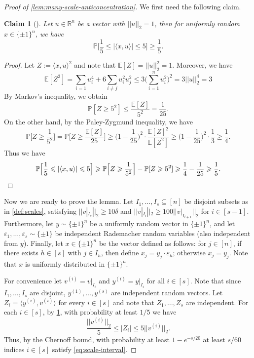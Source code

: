 \documentclass[reqno]{amsart}
\newtheorem{claim}[theorem]{Claim}
\theoremstyle{remark}
\theoremstyle{definition}
\numberwithin{theorem}{section}
\renewcommand{\(}{\bigl(}
\renewcommand{\)}{\bigr)\vphantom{)}}
\newcommand{\eps}{\varepsilon}
\newcommand{\E}{\mathbb{E}}
\renewcommand{\le}{\leqslant}
\renewcommand{\ge}{\geqslant}
\renewcommand{\P}{\mathbb{P}}
\newcommand{\R}{\mathbb R}
\newcommand{\ang}[1]{\langle#1\rangle}
\newcommand{\bin}{\{\pm 1\}}
\begin{document}
\begin{proof}[Proof of \cref{lem:many-scale-anticoncentration}]

We first need the following claim.

\begin{claim}[\cite{yehuda2021slicing}]\label{claim:scale-magnitude-interval}
    Let $u\in \R^n$ be a vector with $||u||_2 = 1$, then for  uniformly random $x\in\bin^n$, we have
    \[\P\Big[\frac{1}{5}\le |\ang{x,u}|\le 5\Big] \ge \frac{1}{5}.\]
\end{claim}

\begin{proof}
    Let $Z:= \ang{x,u}^2$ and note that $\E[Z] = ||u||_2^2 = 1$. Moreover, we have 
    \[\E[Z^2] = \sum_{i = 1}u_i^4 + 6\sum_{i\ne j}u_i^2u_j^2 \le 3\Big(\sum_{i = 1}^n u_i^2\Big)^2 = 3||u||_2^4 = 3 \]
    By Markov's inequality, we obtain
    \[\P[Z\ge 5^2]\le \frac{\E[Z]}{5^2}=\frac{1}{25}.\]
    On the other hand, by the Paley-Zygmund inequality, we have 
    \[\P\Big[Z\ge \frac{1}{5^2}\Big]=\P\Big[Z\ge \frac{\E[Z]}{25}\Big]\ge \Big(1-\frac{1}{25}\Big)^2\cdot \frac{\E[Z]^2}{\E[Z^2]}\ge \Big(1-\frac{1}{25}\Big)^2\cdot \frac{1}{3}\ge \frac{1}{4}.\]
    Thus we have
    \[\P\Big[\frac{1}{5}\le |\ang{x,u}|\le 5\Big]\ge \P\Big[Z\ge \frac{1}{5^2}\Big]- \P[Z\ge 5^2] \ge \frac{1}{4} - \frac{1}{25}\ge \frac{1}{5}. \qedhere\]
\end{proof}

Now we are ready to prove the lemma. Let $I_1,\dots, I_s\subseteq [n]$ be disjoint subsets as in \cref{def:scales}, satisfying $||v|_{I_s}||_2 \ge 10\delta$ and $||v|_{I_i}||_2 \ge 100||v|_{I_{i+1}}||_2$ for $i\in [s-1]$. Furthermore, let $y\sim \bin^n$ be a uniformly random vector in $\bin^n$, and let $\eps_1,\dots, \eps_s\sim \bin$ be independent Rademacher random variables (also independent from $y$). Finally, let $x\in \bin^n$ be the vector defined as follows: for $j\in [n]$, if there exists $h\in [s]$ with $j\in I_h$, then define $x_j = y_j\cdot \eps_h$; otherwise $x_j = y_j$. Note that $x$ is uniformly distributed in $\bin^n$.

For convenience let $v^{(i)} = v|_{I_i}$ and $y^{(i)} = y|_{I_i}$ for all $i\in [s]$. Note that since $I_1,\dots, I_s$ are disjoint, $y^{(1)},\dots, y^{(s)}$ are independent random vectors. Let $Z_i = \ang{y^{(i)}, v^{(i)}}$ for every $i\in [s]$ and note that $Z_1,\dots, Z_s$ are independent. For each $i\in [s]$, by \cref{claim:scale-magnitude-interval}, with probability at least $1/5$ we have
\begin{equation}\label{eq:scale-interval}
    \frac{||v^{(i)}||_2}{5}\le |Z_i| \le 5||v^{(i)}||_2.
\end{equation}
Thus, by the Chernoff bound, with probability at least $1 - e^{-s/20}$ at least $s/60$ indices $i\in [s]$ satisfy \eqref{eq:scale-interval}. 


\end{proof}
\end{document}
